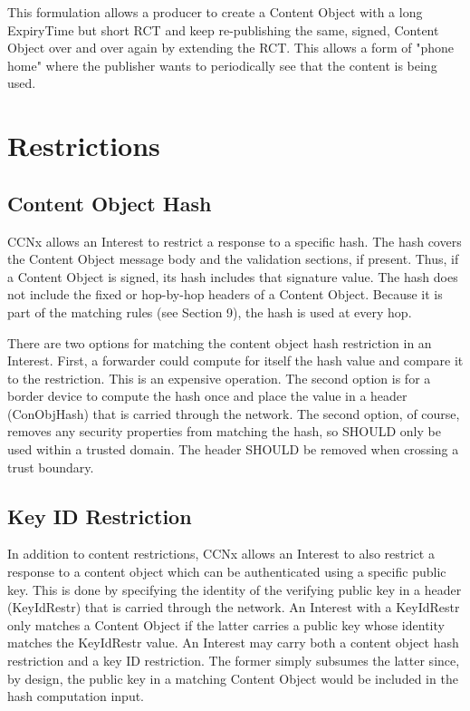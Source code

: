 \documentclass[12pt]{article}
\begin{document}
This formulation allows a producer to create a Content Object with a
long ExpiryTime but short RCT and keep re-publishing the same,
signed, Content Object over and over again by extending the RCT.
This allows a form of "phone home" where the publisher wants to
periodically see that the content is being used.

\section{Restrictions}

\subsection{Content Object Hash}
CCNx allows an Interest to restrict a response to a specific hash.
The hash covers the Content Object message body and the validation
sections, if present.  Thus, if a Content Object is signed, its hash
includes that signature value.  The hash does not include the fixed
or hop-by-hop headers of a Content Object.  Because it is part of the
matching rules (see Section 9), the hash is used at every hop.

There are two options for matching the content object hash
restriction in an Interest.  First, a forwarder could compute for
itself the hash value and compare it to the restriction.  This is an
expensive operation.  The second option is for a border device to
compute the hash once and place the value in a header (ConObjHash)
that is carried through the network.  The second option, of course,
removes any security properties from matching the hash, so SHOULD
only be used within a trusted domain.  The header SHOULD be removed
when crossing a trust boundary.

\subsection{Key ID Restriction}
In addition to content restrictions, CCNx allows an Interest to also
restrict a response to a content object
which can be authenticated using a specific public key. This is done by
specifying the identity of the verifying public key in a header (KeyIdRestr)
that is carried through the network. An Interest with a KeyIdRestr only matches a
Content Object if the latter carries a public key whose identity matches the
KeyIdRestr value. An Interest may carry both a content object hash restriction
and a key ID restriction. The former simply subsumes the latter since, by design,
the public key in a matching Content Object would be included in the hash computation input.
\end{document}
